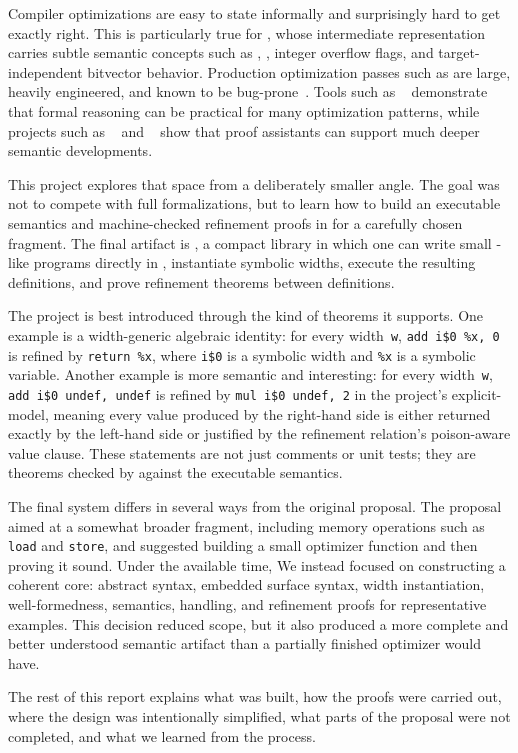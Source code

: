 Compiler optimizations are easy to state informally and surprisingly hard to
get exactly right. This is particularly true for \llvm, whose intermediate
representation carries subtle semantic concepts such as \poison,
\vundef, integer overflow flags, and target-independent bitvector behavior.
Production optimization passes such as \instcombine are large, heavily
engineered, and known to be bug-prone~\cite{yang2011finding}. Tools such as
\alive~\cite{lopes2021alive2} demonstrate that formal reasoning can be
practical for many optimization patterns, while projects such as
\vellvm~\cite{zhao2012formalizing} and \leanmlir~\cite{bhat2024verifying}
show that proof assistants can support much deeper semantic developments.

This project explores that space from a deliberately smaller angle. The goal
was not to compete with full \llvm formalizations, but to learn how to build
an executable semantics and machine-checked refinement proofs in \lean for a
carefully chosen fragment. The final artifact is
\proj, a compact \lean library in which one can write
small \llvm-like programs directly in \lean, instantiate symbolic widths,
execute the resulting definitions, and prove refinement theorems between
definitions.

The project is best introduced through the kind of theorems it supports. One
example is a width-generic algebraic identity: for every width~\texttt{w},
\texttt{add i\$0 \%x, 0} is refined by \texttt{return \%x},
where \texttt{i\$0} is a symbolic width and \texttt{\%x} is a symbolic variable.
Another example is more semantic and interesting: for every width~\texttt{w},
\texttt{add i\$0 undef, undef} is refined by \texttt{mul i\$0 undef, 2} in the
project's explicit-\vundef model, meaning every value produced by the
right-hand side is either returned exactly by the left-hand side or justified
by the refinement relation's poison-aware value clause. These statements are not just comments or
unit tests; they are theorems checked by \lean against the executable
semantics.

The final system differs in several ways from the original proposal. The
proposal aimed at a somewhat broader \llvm fragment, including memory
operations such as \texttt{load} and \texttt{store}, and suggested building a
small optimizer function and then proving it sound. Under the available time,
We instead focused on constructing a coherent core: abstract syntax, embedded
surface syntax, width instantiation, well-formedness, semantics,
\vundef handling, and refinement proofs for representative examples. This
decision reduced scope, but it also produced a more complete and better
understood semantic artifact than a partially finished optimizer would have.

The rest of this report explains what was built, how the proofs were carried
out, where the design was intentionally simplified, what parts of the
proposal were not completed, and what we learned from the process.
